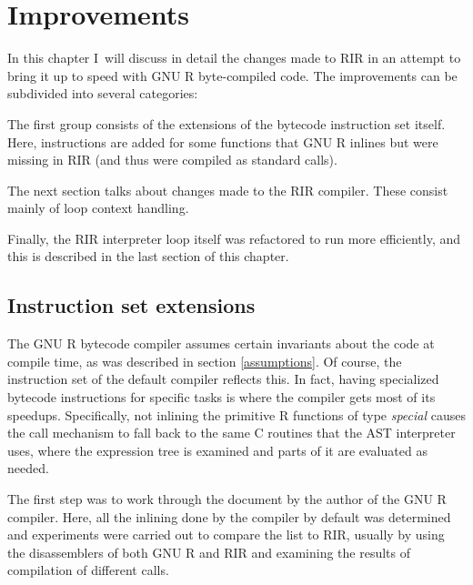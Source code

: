 \chapter{Improvements\label{improvements}}

In this chapter I~will discuss in detail the changes made to RIR in an attempt to bring it up to speed with GNU R byte-compiled code. The improvements can be subdivided into several categories:

The first group consists of the extensions of the bytecode instruction set itself. Here, instructions are added for some functions that GNU R inlines but were missing in RIR (and thus were compiled as standard calls).

The next section talks about changes made to the RIR compiler. These consist mainly of loop context handling.

Finally, the RIR interpreter loop itself was refactored to run more efficiently, and this is described in the last section of this chapter.


\section{Instruction set extensions}

The GNU R bytecode compiler assumes certain invariants about the code at compile time, as was described in section \ref{assumptions}. Of course, the instruction set of the default compiler reflects this. In fact, having specialized bytecode instructions for specific tasks is where the compiler gets most of its speedups. Specifically, not inlining the primitive R functions of type \emph{special} causes the call mechanism to fall back to the same C routines that the AST interpreter uses, where the expression tree is examined and parts of it are evaluated as needed.


The first step was to work through the document \autocite{compiler} by the author of the GNU R compiler. Here, all the inlining done by the compiler by default was determined and experiments were carried out to compare the list to RIR, usually by using the disassemblers of both GNU R and RIR and examining the results of compilation of different calls.


